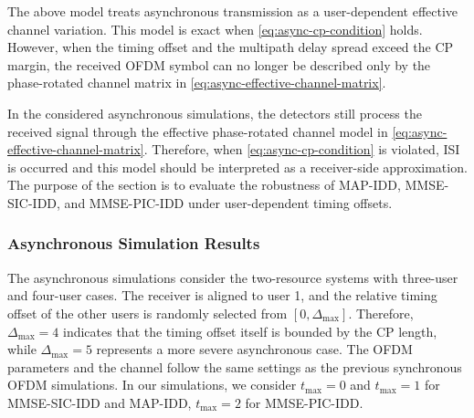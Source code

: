 The above model treats asynchronous transmission as a user-dependent effective channel variation. This model is exact when \eqref{eq:async-cp-condition} holds. However, when the timing offset and the multipath delay spread exceed the CP margin, the received OFDM symbol can no longer be described only by the phase-rotated channel matrix in \eqref{eq:async-effective-channel-matrix}. 

In the considered asynchronous simulations, the detectors still process the received signal through the effective phase-rotated channel model in \eqref{eq:async-effective-channel-matrix}. Therefore, when \eqref{eq:async-cp-condition} is violated, ISI is occurred and this model should be interpreted as a receiver-side approximation. 
The purpose of the section is to evaluate the robustness of MAP-IDD, MMSE-SIC-IDD, and MMSE-PIC-IDD under user-dependent timing offsets.


\subsubsection{Asynchronous Simulation Results}
The asynchronous simulations consider the two-resource systems with three-user and four-user cases. 
The receiver is aligned to user 1, and the relative timing offset of the other users is randomly selected from $[0,\Delta_{\max}]$. 
Therefore, $\Delta_{\max}=4$ indicates that the timing offset itself is bounded by the CP length, while $\Delta_{\max}=5$ represents a more severe asynchronous case.
The OFDM parameters and the channel follow the same settings as the previous synchronous OFDM simulations. 
In our simulations, we consider $t_{\max}=0$ and $t_{\max}=1$ for MMSE-SIC-IDD and MAP-IDD, $t_{\max}=2$ for MMSE-PIC-IDD.


